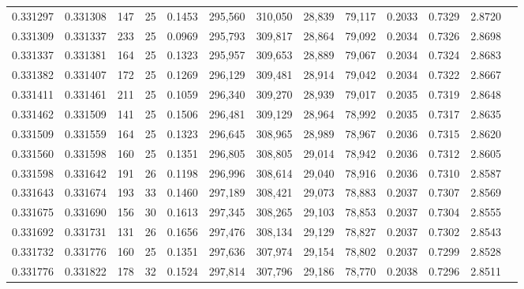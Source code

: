 \begin{tabular}{rrrrrrrrrrrrr}
0.331297 & 0.331308 &   147 &  25 &                                     0.1453 & 295,560 & 310,050 &  28,839 &  79,117 & 0.2033 & 0.7329 & 2.8720 \\
0.331309 & 0.331337 &   233 &  25 &                                     0.0969 & 295,793 & 309,817 &  28,864 &  79,092 & 0.2034 & 0.7326 & 2.8698 \\
0.331337 & 0.331381 &   164 &  25 &                                     0.1323 & 295,957 & 309,653 &  28,889 &  79,067 & 0.2034 & 0.7324 & 2.8683 \\
0.331382 & 0.331407 &   172 &  25 &                                     0.1269 & 296,129 & 309,481 &  28,914 &  79,042 & 0.2034 & 0.7322 & 2.8667 \\
0.331411 & 0.331461 &   211 &  25 &                                     0.1059 & 296,340 & 309,270 &  28,939 &  79,017 & 0.2035 & 0.7319 & 2.8648 \\
0.331462 & 0.331509 &   141 &  25 &                                     0.1506 & 296,481 & 309,129 &  28,964 &  78,992 & 0.2035 & 0.7317 & 2.8635 \\
0.331509 & 0.331559 &   164 &  25 &                                     0.1323 & 296,645 & 308,965 &  28,989 &  78,967 & 0.2036 & 0.7315 & 2.8620 \\
0.331560 & 0.331598 &   160 &  25 &                                     0.1351 & 296,805 & 308,805 &  29,014 &  78,942 & 0.2036 & 0.7312 & 2.8605 \\
0.331598 & 0.331642 &   191 &  26 &                                     0.1198 & 296,996 & 308,614 &  29,040 &  78,916 & 0.2036 & 0.7310 & 2.8587 \\
0.331643 & 0.331674 &   193 &  33 &                                     0.1460 & 297,189 & 308,421 &  29,073 &  78,883 & 0.2037 & 0.7307 & 2.8569 \\
0.331675 & 0.331690 &   156 &  30 &                                     0.1613 & 297,345 & 308,265 &  29,103 &  78,853 & 0.2037 & 0.7304 & 2.8555 \\
0.331692 & 0.331731 &   131 &  26 &                                     0.1656 & 297,476 & 308,134 &  29,129 &  78,827 & 0.2037 & 0.7302 & 2.8543 \\
0.331732 & 0.331776 &   160 &  25 &                                     0.1351 & 297,636 & 307,974 &  29,154 &  78,802 & 0.2037 & 0.7299 & 2.8528 \\
0.331776 & 0.331822 &   178 &  32 &                                     0.1524 & 297,814 & 307,796 &  29,186 &  78,770 & 0.2038 & 0.7296 & 2.8511 \\

\end{tabular}
